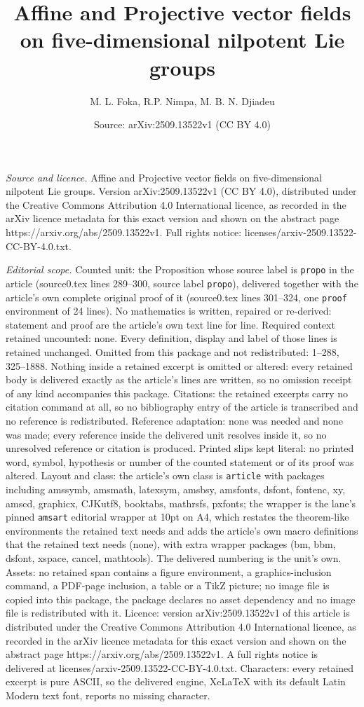 \documentclass[10pt,a4paper]{amsart}
\title[Affine and Projective vector fields on five-dimensional nilp]{Affine and Projective vector fields on five-dimensional nilpotent Lie groups}
\author{M. L. Foka, R.P. Nimpa, M. B. N. Djiadeu}
\date{Source: arXiv:2509.13522v1 (CC BY 4.0)}
\begin{document}
\maketitle

\noindent\emph{Source and licence.} Affine and Projective vector fields on five-dimensional nilpotent Lie groups. Version arXiv:2509.13522v1 (CC BY 4.0), distributed under the Creative Commons Attribution 4.0 International licence, as recorded in the arXiv licence metadata for this exact version and shown on the abstract page https://arxiv.org/abs/2509.13522v1. Full rights notice: licenses/arxiv-2509.13522-CC-BY-4.0.txt.\par\smallskip

\noindent\textit{Editorial scope.} Counted unit: the Proposition whose source label is \texttt{propo} in the article (source0.tex lines 289--300, source label \texttt{propo}), delivered together with the article's own complete original proof of it (source0.tex lines 301--324, one \texttt{proof} environment of 24 lines). No mathematics is written, repaired or re-derived: statement and proof are the article's own text line for line. Required context retained uncounted: none. Every definition, display and label of those lines is retained unchanged. Omitted from this package and not redistributed: 1--288, 325--1888. Nothing inside a retained excerpt is omitted or altered: every retained body is delivered exactly as the article's lines are written, so no omission receipt of any kind accompanies this package. Citations: the retained excerpts carry no citation command at all, so no bibliography entry of the article is transcribed and no reference is redistributed. Reference adaptation: none was needed and none was made; every reference inside the delivered unit resolves inside it, so no unresolved reference or citation is produced. Printed slips kept literal: no printed word, symbol, hypothesis or number of the counted statement or of its proof was altered. Layout and class: the article's own class is \texttt{article} with packages including amssymb, amsmath, latexsym, amsbsy, amsfonts, dsfont, fontenc, xy, amscd, graphicx, CJKutf8, booktabs, mathrsfs, pxfonts; the wrapper is the lane's pinned \texttt{amsart} editorial wrapper at 10pt on A4, which restates the theorem-like environments the retained text needs and adds the article's own macro definitions that the retained text needs (none), with extra wrapper packages (bm, bbm, dsfont, xspace, cancel, mathtools). The delivered numbering is the unit's own. Assets: no retained span contains a figure environment, a graphics-inclusion command, a PDF-page inclusion, a table or a TikZ picture; no image file is copied into this package, the package declares no asset dependency and no image file is redistributed with it. Licence: version arXiv:2509.13522v1 of this article is distributed under the Creative Commons Attribution 4.0 International licence, as recorded in the arXiv licence metadata for this exact version and shown on the abstract page https://arxiv.org/abs/2509.13522v1. A full rights notice is delivered at licenses/arxiv-2509.13522-CC-BY-4.0.txt. Characters: every retained excerpt is pure ASCII, so the delivered engine, XeLaTeX with its default Latin Modern text font, reports no missing character.
\end{document}
